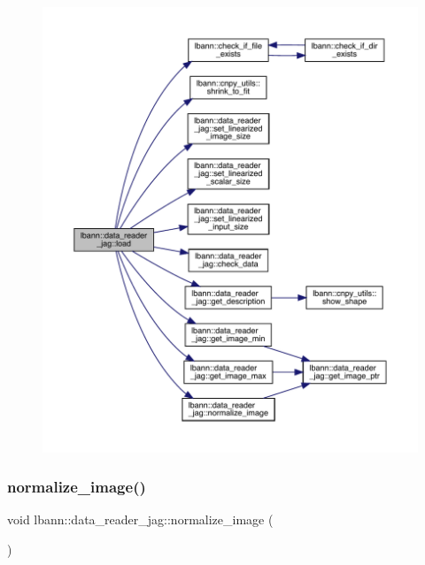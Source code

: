 \begin{figure}[H]
\begin{center}
\leavevmode
\includegraphics[width=350pt]{classlbann_1_1data__reader__jag_a300a937eb6022b5b2cd6d9405beb3d83_cgraph}
\end{center}
\end{figure}
\mbox{\label{classlbann_1_1data__reader__jag_ad145def7b548ca2d0d3f207f6376b114}} 
\subsubsection{\texorpdfstring{normalize\+\_\+image()}{normalize\_image()}}
{\footnotesize\ttfamily void lbann\+::data\+\_\+reader\+\_\+jag\+::normalize\+\_\+image (\begin{DoxyParamCaption}{ }\end{DoxyParamCaption})\hspace{0.3cm}{\ttfamily [protected]}}

